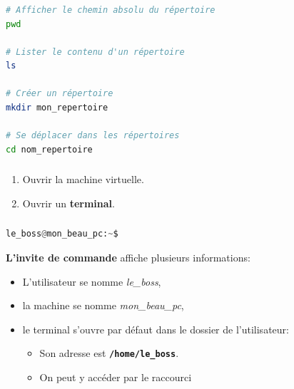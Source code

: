 \documentclass[svgnames,11pt]{beamer}
\begin{document}
\begin{frame}[fragile]
    \frametitle{}

\begin{center}
\begin{lstlisting}[language=Bash , basicstyle=\ttfamily\small, xleftmargin=1em, xrightmargin=1em]
# Afficher le chemin absolu du répertoire
pwd

# Lister le contenu d'un répertoire
ls

# Créer un répertoire
mkdir mon_repertoire

# Se déplacer dans les répertoires
cd nom_repertoire
\end{lstlisting}
\end{center}

\end{frame}
\begin{frame}
    \frametitle{}

    \begin{activite}
    \begin{enumerate}
        \item Ouvrir la machine virtuelle.
        \item Ouvrir un \textbf{terminal}.
    \end{enumerate}
    \end{activite}

\end{frame}
\begin{frame}[fragile]
    \frametitle{}

\begin{center}
\begin{lstlisting}[language=Python , basicstyle=\ttfamily\small, xleftmargin=2em, xrightmargin=2em]
le_boss@mon_beau_pc:~$
\end{lstlisting}
\label{CODE}
\end{center}
\textbf{L'invite de commande} affiche plusieurs informations:
\begin{itemize}
    \item L'utilisateur se nomme \emph{le\_boss},
    \item la machine se nomme \emph{mon\_beau\_pc},
    \item le terminal s'ouvre par défaut dans le dossier de l'utilisateur:
    \begin{itemize}
        \item Son adresse est \textbf{\texttt{/home/le\_boss}}.
        \item On peut y accéder par le raccourci \textbf{\texttt{~}}
    \end{itemize}
\end{itemize}
\end{frame}
\end{document}
